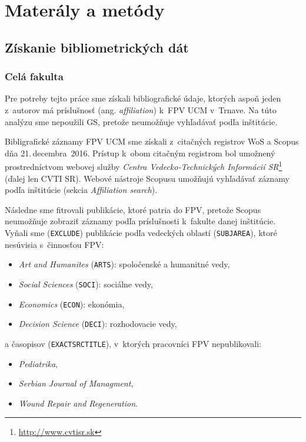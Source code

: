 \chapter{Materály a metódy}

\section{Získanie bibliometrických dát}

  \subsection{Celá fakulta}
  \label{sec.all.mining}

  Pre potreby tejto práce sme získali bibliografické údaje, ktorých aspoň jeden
  z~autorov má príslušnosť (ang. \emph{affiliation}) k~FPV UCM v~Trnave. Na túto
  analýzu sme nepoužili GS, pretože neumožňuje vyhľadávať podľa inštitúcie.

  Bibligrafické záznamy FPV UCM sme získali z~citačných registrov
  WoS a Scopus dňa 21.\,decembra~2016.  Prístup k~obom citačným registrom bol
  umožnený prostredníctvom webovej služby \emph{Centra Vedecko-Technických
  Informácií SR}\footnote{\url{http://www.cvtisr.sk}} (ďalej len CVTI SR).  Webové nástroje Scopusu
  umožňujú vyhľadávať záznamy podľa inštitúcie (sekcia \emph{Affiliation search}).

  Následne sme fitrovali publikácie, ktoré patria do FPV, pretože Scopus
  neumožňuje zobraziť záznamy podľa príslušnosti k~fakulte danej inštitúcie.
  Vyňali sme (\texttt{EXCLUDE}) publikácie podľa vedeckých oblastí
  (\texttt{SUBJAREA}), ktoré nesúvisia s~činnosťou FPV:

  \begin{itemize}
    \item \emph{Art and Humanites} (\texttt{ARTS}): spoločenské a humanitné vedy,
    \item \emph{Social Sciences} (\texttt{SOCI}): sociálne vedy,
    \item \emph{Economics} (\texttt{ECON}): ekonómia,
    \item \emph{Decision Science} (\texttt{DECI}): rozhodovacie vedy,
  \end{itemize}
  a časopisov (\texttt{EXACTSRCTITLE}), v~ktorých pracovníci FPV nepublikovali:

  \begin{itemize}
    \item \emph{Pediatrika},
    \item \emph{Serbian Journal of Managment},
    \item \emph{Wound Repair and Regeneration}.
  \end{itemize}

